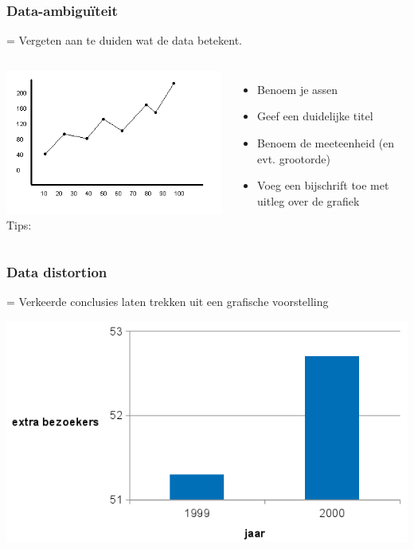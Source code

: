 \documentclass{beamer}
\begin{document}
\begin{frame}
  \frametitle{Data-ambiguïteit}

  = Vergeten aan te duiden wat de data betekent.
  \vspace{1cm}

  \begin{columns}
    \includegraphics[width=\textwidth]{img/les2-02}
    Tips:
    \begin{itemize}
      \item Benoem je assen
      \item Geef een duidelijke titel
      \item Benoem de meeteenheid (en evt. grootorde)
      \item Voeg een bijschrift toe met uitleg over de grafiek
    \end{itemize}
  \end{columns}
\end{frame}

\begin{frame}
  \frametitle{Data distortion}

  = Verkeerde conclusies laten trekken uit een grafische voorstelling

  \begin{center}
    \includegraphics[width=.7\textwidth]{img/les2-03}
  \end{center}
\end{frame}
\end{document}
